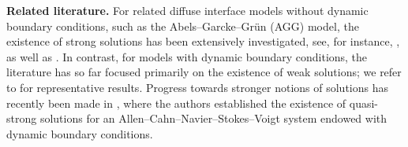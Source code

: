 \documentclass[10pt,reqno]{amsart}
\theoremstyle{remark}
\numberwithin{equation}{section}
\begin{document}
\textbf{Related literature.} 
For related diffuse interface models without dynamic boundary conditions, such as the Abels--Garcke--Grün (AGG) model, the existence of strong solutions has been extensively investigated, see, for instance, \cite{Abels2021, Abels2024a, Giorgini2021, Giorgini2022}, as well as \cite{Giorgini2020, Giorgini2019}. In contrast, for models with dynamic boundary conditions, the literature has so far focused primarily on the existence of weak solutions; we refer to \cite{Chan2025, Gal2019, Giorgini2023, Gal2023a, Knopf2025a} for representative results. Progress towards stronger notions of solutions has recently been made in \cite{Gal2023c}, where the authors established the existence of quasi-strong solutions for an Allen--Cahn--Navier--Stokes--Voigt system endowed with dynamic boundary conditions.
\end{document}
